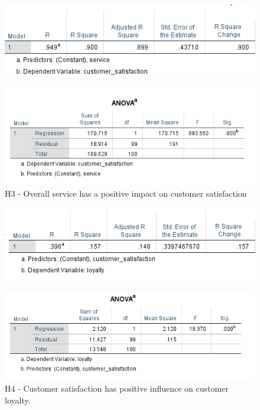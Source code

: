 \documentclass[a4paper, 14pt]{article}
\begin{document}
{\begin{figure}[H]
\centering
\includegraphics[scale=1]{sp_vs_cs.png}
\end{figure}

\begin{figure}[H]
\centering
\includegraphics[scale=1]{anova_css.png}
\caption{H3 - Overall service has a positive impact on customer satisfaction}
\end{figure}

\begin{figure}[H]
\centering
\includegraphics[scale=1]{customer_satisfaction_vs_loyalty.png}
\end{figure}

\begin{figure}[H]
\centering
\includegraphics[scale=1]{anova_cs_lo.png}
\caption{H4 - Customer satisfaction has positive influence on customer loyalty.}
\end{figure}

}
\end{document}
